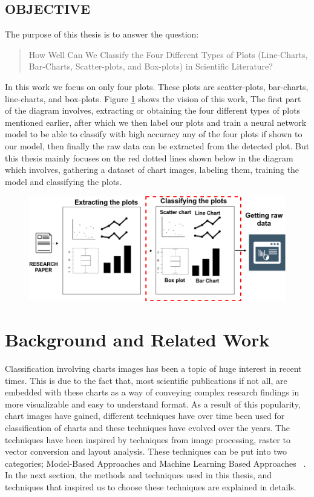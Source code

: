 \documentclass[12pt, a4paper,oneside]{report}
\begin{document}
\section{OBJECTIVE}
The purpose of this thesis is to answer the question: \begin{quote} How Well Can We Classify the Four Different Types of Plots (Line-Charts, Bar-Charts, Scatter-plots, and Box-plots) in Scientific Literature? \end{quote} In this work we focus on only four plots. These plots are scatter-plots, bar-charts, line-charts, and box-plots. Figure \ref{fig:vis} shows the vision of this work, The first part of the diagram involves, extracting or obtaining  the four different types of plots mentioned earlier, after which we then label our plots and train a neural network model to be able to classify with high accuracy any of the four plots if shown to our model, then finally the raw data can be extracted from the detected plot.
But this thesis mainly focuses on the red dotted lines shown below in the diagram which involves, gathering a dataset of chart images, labeling them, training the model and classifying the plots. \\

\begin{figure}
\includegraphics [scale=0.5] {vision}
\label{fig:vis}
\end{figure}

\chapter{Background and Related Work}
Classification involving charts images has been a topic of huge interest in recent times. This is due to the fact that, most scientific publications if not all, are embedded with these charts as a way of conveying complex research findings in more visualizable and easy to understand format. As a result of this popularity, chart images have gained, different techniques have over time been used for classification of charts and these techniques have evolved over the years. The techniques have been inspired by techniques from image processing, raster to vector conversion and layout analysis. These techniques can be put into two categories; Model-Based Approaches and Machine Learning Based Approaches ~\cite{amara2017convolutional}. In the next section, the methods and techniques used in this thesis, and techniques that inspired us to choose these techniques are explained in details.
\end{document}
